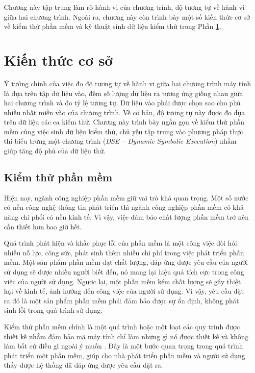 Chương này tập trung làm rõ hành vi của chương trình, độ tương tự về
hành vi giữa hai chương trình. Ngoài ra, chương này còn trình bày một 
số kiến thức cơ sở về kiểm thử phần mềm và kỹ thuật sinh dữ liệu kiểm 
thử trong Phần \ref{sec:base}.
\section{Kiến thức cơ sở}
\label{sec:base}

Ý tưởng chính của việc đo độ tương tự về hành vi giữa hai chương trình
máy tính là dựa trên tập dữ liệu vào, đếm số lượng dữ liệu ra tương
ứng giống nhau giữa hai chương trình và đo tỷ lệ tương tự. Dữ liệu vào
phải được chọn sao cho phủ nhiều nhất miền vào của chương trình. Về cơ
bản, độ tương tự này được đo dựa trên dữ liệu các ca kiểm thử. Chương
này trình bày ngắn gọn về kiểm thử phần mềm cùng việc sinh dữ liệu
kiểm thử, chủ yếu tập trung vào phương pháp thực thi biểu trưng một
chương trình (\emph{DSE -- Dynamic Symbolic Execution}) nhằm giúp 
tăng độ phủ của dữ liệu thử.

\subsection{Kiểm thử phần mềm}
Hiện nay, ngành công nghiệp phần mềm giữ vai trò khá quan trọng. Một
số nước có nền công nghệ thông tin phát triển thì ngành công nghiệp
phần mềm có khả năng chi phối cả nền kinh tế. Vì vậy, việc đảm bảo
chất lượng phần mềm trở nên cần thiết hơn bao giờ hết.

Quá trình phát hiện và khắc phục lỗi của phần mềm là một công việc đòi 
hỏi nhiều nỗ lực, công sức, phát sinh thêm nhiều chi phí trong việc phát 
triển phần mềm. Một sản phẩm phần mềm đạt chất lượng, đáp ứng được yêu 
cầu của người sử dụng sẽ được nhiều người biết đến, nó mang lại hiệu quả 
tích cực trong công việc của người sử dụng. Ngược lại, một phần mềm kém 
chất lượng sẽ gây thiệt hại về kinh tế, ảnh hưởng đến công việc của người 
sử dụng. Vì vậy, yêu cầu đặt ra đó là một sản phẩm phần mềm phải đảm bảo 
được sự ổn định, không phát sinh lỗi trong quá trình sử dụng.

Kiểm thử phần mềm chính là một quá trình hoặc một loạt các quy trình
được thiết kế nhằm đảm bảo mã máy tính chỉ làm những gì nó được thiết
kế và không làm bất cứ điều gì ngoài ý muốn \cite{myers2011art}. Đây
là một bước quan trọng trong quá trình phát triển một phần mềm, giúp
cho nhà phát triển phần mềm và người sử dụng thấy được hệ thống đã đáp
ứng được yêu cầu đặt ra.

